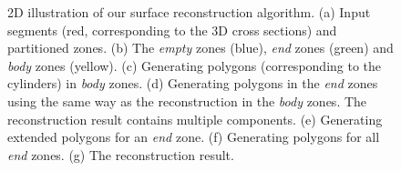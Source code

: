 \begin{figure} [htbp]
{\begin{minipage}[b]{0.23\textwidth}
    \end{minipage}}
  \caption{2D illustration of our surface reconstruction algorithm.
  (a) Input segments (red, corresponding to the 3D cross sections) and partitioned zones.
  (b) The \textit{empty} zones (blue), \textit{end} zones (green) and \textit{body} zones (yellow).
  (c) Generating polygons (corresponding to the cylinders) in \textit{body} zones.
  (d) Generating polygons in the \textit{end} zones using the same way as the reconstruction in the \textit{body} zones. The reconstruction result contains multiple components.
  (e) Generating extended polygons for an \textit{end} zone.
  (f) Generating polygons for all \textit{end} zones.
  (g) The reconstruction result. }
  \label{fig:workflow2dortho}
\end{figure}


